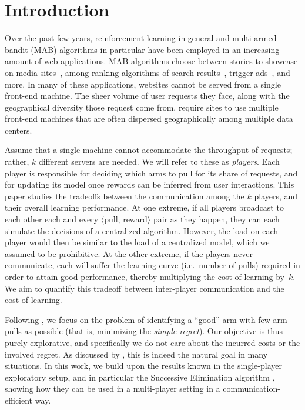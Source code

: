 
\section{Introduction}
\label{sec:intro}
Over the past few years, reinforcement learning in general and multi-armed bandit
(MAB) algorithms in particular have been employed in an increasing amount of web applications.
MAB algorithms choose between stories to showcase on media
sites~\citep{COKE2009,COKE2008}, among ranking algorithms of search
results~\citep{RTUF-learning2010,InterleavedBuckets,Dueling2009}, trigger
ads~\citep{COKE-mortal2008}, and more.
In many of these applications, websites cannot be served from a single front-end machine.
The sheer volume of user requests they face, along with the geographical diversity those request come from, require sites to use multiple front-end machines that are often dispersed geographically among multiple data centers.

Assume that a single machine cannot accommodate the
throughput of requests; rather, $k$ different servers are needed. We will
refer to these as {\em players}. Each player is responsible for deciding
which arms to pull for its share of requests, and for updating its model once
rewards can be inferred from user interactions. 
This paper studies the tradeoffs between the communication among the $k$
players, and their overall learning performance. At one extreme, if
all players broadcast to each other each and every $\langle$pull, reward$\rangle$
pair as they happen, they can each simulate the decisions of a centralized algorithm. However, the load on each player would then be
similar to the load of a centralized model, which we assumed to be prohibitive. 
At the other extreme, if the players never communicate, each will suffer the
learning curve (i.e.~number of pulls) required in order to attain good
performance, thereby multiplying the cost of learning by~$k$. We aim to quantify
this tradeoff between inter-player communication and the cost of learning.

Following \citet{audibert10,evendar06}, we focus on the problem of identifying a ``good'' arm with few arm pulls as possible (that is, minimizing the \emph{simple regret}).
Our objective is thus purely explorative, and specifically we do not care about the incurred costs or the involved regret. 
As discussed by \citet{bubeck2009pure,audibert10}, this is indeed the natural goal in many situations.
In this work, we build upon the results known in the single-player exploratory setup, and in particular the Successive Elimination algorithm \citep{evendar06}, showing how they can be used in a multi-player setting in a communication-efficient way.

